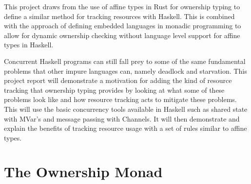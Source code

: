 \documentclass[onehalf,11pt]{beavtex}
\begin{document}
This project draws from the use of affine types in Rust for
ownership typing to define a similar method for tracking resources with Haskell.
This is combined with the approach of defining embedded languages in monadic
programming to allow for dynamic ownership checking without language level
support for affine types in Haskell.

Concurrent Haskell programs can still fall prey to some of the same fundamental
problems that other impure languages can, namely deadlock and starvation.
This project report will demonstrate a motivation for adding the kind of
resource tracking that ownership typing provides by looking at what some of
these problems look like and how resource tracking acts to mitigate these
problems.  This will use the basic concurrency tools available in Haskell
such as shared state with MVar's and message passing with Channels.
It will then demonstrate and explain the benefits of tracking resource usage
with a set of rules similar to affine types.





\chapter{The Ownership Monad}
\end{document}
